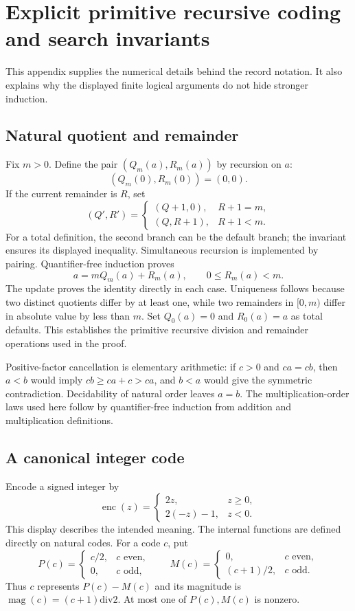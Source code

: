 \section{Explicit primitive recursive coding and search invariants}
\label{app:coding}

This appendix supplies the numerical details behind the record notation.
It also explains why the displayed finite logical arguments do not hide
stronger induction.

\subsection{Natural quotient and remainder}

Fix $m>0$. Define the pair $(Q_m(a),R_m(a))$ by recursion on $a$:
\[
 (Q_m(0),R_m(0))=(0,0).
\]
If the current remainder is $R$, set
\[
 (Q',R')=
 \begin{cases}
 (Q+1,0),&R+1=m,\\
 (Q,R+1),&R+1<m.
 \end{cases}
\]
For a total definition, the second branch can be the default branch;
the invariant ensures its displayed inequality. Simultaneous recursion is
implemented by pairing. Quantifier-free induction proves
\[
 a=mQ_m(a)+R_m(a),\qquad 0\le R_m(a)<m.
\]
The update proves the identity directly in each case. Uniqueness follows
because two distinct quotients differ by at least one, while two
remainders in $[0,m)$ differ in absolute value by less than $m$.
Set $Q_0(a)=0$ and $R_0(a)=a$ as total defaults. This establishes the
primitive recursive division and remainder operations used in the proof.

Positive-factor cancellation is elementary arithmetic: if $c>0$ and
$ca=cb$, then $a<b$ would imply $cb\ge ca+c>ca$, and $b<a$ would
give the symmetric contradiction. Decidability of natural order leaves
$a=b$. The multiplication-order laws used here follow by quantifier-free
induction from addition and multiplication definitions.

\subsection{A canonical integer code}

Encode a signed integer by
\[
 \operatorname{enc}(z)=
 \begin{cases}
 2z,&z\ge0,\\
 2(-z)-1,&z<0.
 \end{cases}
\]
This display describes the intended meaning. The internal functions are
defined directly on natural codes. For a code $c$, put
\[
 P(c)=\begin{cases}c/2,&c\text{ even},\\0,&c\text{ odd},\end{cases}
 \qquad
 M(c)=\begin{cases}0,&c\text{ even},\\(c+1)/2,&c\text{ odd}.\end{cases}
\]
Thus $c$ represents $P(c)-M(c)$ and its magnitude is
$\operatorname{mag}(c)=(c+1)\mathbin{\mathrm{div}}2$.
At most one of $P(c),M(c)$ is nonzero.

